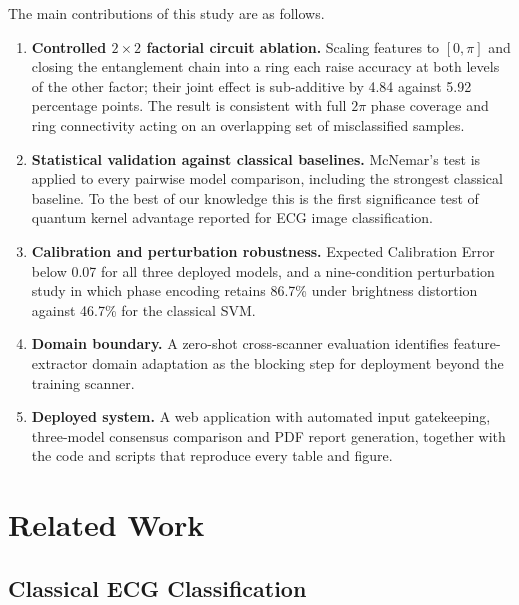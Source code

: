\documentclass[10pt,conference]{IEEEtran}
\begin{document}
The main contributions of this study are as follows.
\begin{enumerate}
  \item \textbf{Controlled $2\!\times\!2$ factorial circuit ablation.}
    Scaling features to $[0,\pi]$ and closing the entanglement chain into
    a ring each raise accuracy at both levels of the other factor; their
    joint effect is sub-additive by 4.84 against 5.92 percentage points.
    The result is consistent with full $2\pi$ phase coverage and ring
    connectivity acting on an overlapping set of misclassified samples.
  \item \textbf{Statistical validation against classical baselines.}
    McNemar's test is applied to every pairwise model comparison,
    including the strongest classical baseline. To the best of our
    knowledge this is the first significance test of quantum kernel
    advantage reported for ECG image classification.
  \item \textbf{Calibration and perturbation robustness.} Expected
    Calibration Error below 0.07 for all three deployed models, and a
    nine-condition perturbation study in which phase encoding retains
    86.7\% under brightness distortion against 46.7\% for the classical
    SVM.
  \item \textbf{Domain boundary.} A zero-shot cross-scanner evaluation
    identifies feature-extractor domain adaptation as the blocking step
    for deployment beyond the training scanner.
  \item \textbf{Deployed system.} A web application with automated input
    gatekeeping, three-model consensus comparison and PDF report
    generation, together with the code and scripts that reproduce every
    table and figure.
\end{enumerate}

\section{Related Work}

\subsection{Classical ECG Classification}
\end{document}
